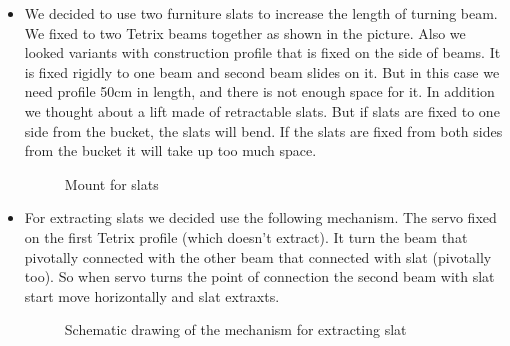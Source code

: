 \begin{itemize}
\item We decided to use two furniture slats to increase the length of turning beam. We fixed to two Tetrix beams together as shown in the picture. Also we looked variants with construction profile that is fixed on the side of beams. It is fixed rigidly to one beam and second beam slides on it. But in this case we need profile 50cm in length, and there is not enough space for it. In addition we thought about a lift made of retractable slats. But if slats are fixed to one side from the bucket, the slats will bend. If the slats are fixed from both sides from the bucket it will take up too much space.
\begin{figure}[H]
	\begin{minipage}[h]{\linewidth}
		\caption{Mount for slats}
	\end{minipage}
\end{figure} 
\item For extracting slats we decided use the following mechanism. The servo fixed on the first Tetrix profile (which doesn't extract). It turn the beam that pivotally connected with the other beam that connected with slat (pivotally too). So when servo turns the point of connection the second beam with slat start move horizontally and slat extraxts. 
\begin{figure}[H]
	\begin{minipage}[h]{\linewidth}
		\caption{Schematic drawing of the mechanism for extracting slat}
	\end{minipage}
\end{figure}


\end{itemize}
